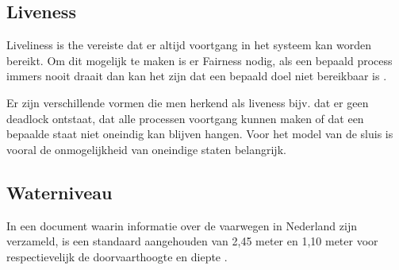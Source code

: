 \subsection{Liveness}
Liveliness is the vereiste dat er altijd voortgang in het systeem kan worden bereikt. Om dit mogelijk te maken is er Fairness nodig, als een bepaald process immers nooit draait dan kan het zijn dat een bepaald doel niet bereikbaar is \cite{fairnessandliveness}.

Er zijn verschillende vormen die men herkend als liveness bijv. dat er geen deadlock ontstaat, dat alle processen voortgang kunnen maken of dat een bepaalde staat niet oneindig kan blijven hangen. Voor het model van de sluis is vooral de onmogelijkheid van oneindige staten belangrijk.

\subsection{Waterniveau}

In een document waarin informatie over de vaarwegen in Nederland zijn verzameld, is een standaard aangehouden van 2,45 meter en 1,10 meter voor respectievelijk de doorvaarthoogte en diepte \cite{vaarwegennederland2017}. 